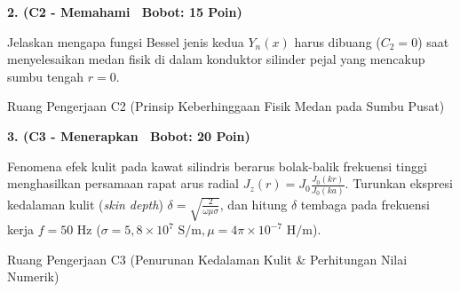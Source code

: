 \documentclass[10pt,a4paper]{article}
\begin{document}
\vspace{1mm}

\noindent\textbf{2. (C2 - Memahami \textbar\ Bobot: 15 Poin)}\par\vspace{0.5mm}
{\footnotesize Jelaskan mengapa fungsi Bessel jenis kedua $Y_n(x)$ harus dibuang ($C_2 = 0$) saat menyelesaikan medan fisik di dalam konduktor silinder pejal yang mencakup sumbu tengah $r=0$.}
\begin{answerbox}{Ruang Pengerjaan C2 (Prinsip Keberhinggaan Fisik Medan pada Sumbu Pusat)}
  \vspace{2.1cm}
\end{answerbox}

\vspace{1mm}

\noindent\textbf{3. (C3 - Menerapkan \textbar\ Bobot: 20 Poin)}\par\vspace{0.5mm}
\noindent\begin{minipage}[t]{0.60\textwidth}%
  {\footnotesize Fenomena efek kulit pada kawat silindris berarus bolak-balik frekuensi tinggi menghasilkan persamaan rapat arus radial $J_z(r) = J_0 \frac{J_0(k r)}{J_0(k a)}$. Turunkan ekspresi kedalaman kulit (\textit{skin depth}) $\delta = \sqrt{\frac{2}{\omega \mu \sigma}}$, dan hitung $\delta$ tembaga pada frekuensi kerja $f=50\text{ Hz}$ ($\sigma = 5{,}8 \times 10^7\text{ S/m}, \mu = 4\pi \times 10^{-7}\text{ H/m}$).}%
\end{minipage}%
\hfill%
\begin{minipage}[t]{0.37\textwidth}%
  \centering
\end{minipage}\par\vspace{1mm}
\begin{answerbox}{Ruang Pengerjaan C3 (Penurunan Kedalaman Kulit \& Perhitungan Nilai Numerik)}
  \vspace{2.8cm}
\end{answerbox}
\end{document}
